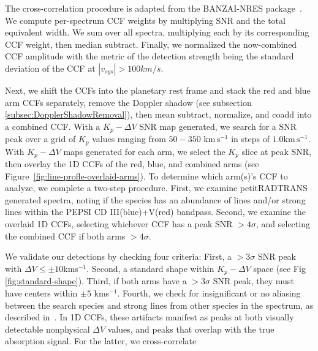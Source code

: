 \documentclass[twocolumn]{aastex631}
\begin{document}
            The cross-correlation procedure is adapted from the BANZAI-NRES package~\citep{McCully2022}. We compute per-spectrum CCF weights by multiplying SNR and the total equivalent width. We sum over all spectra, multiplying each by its corresponding CCF weight, then median subtract. Finally, we normalized the now-combined CCF amplitude with the metric of the detection strength being the standard deviation of the CCF at $|v_{sys}| > 100 km/s$.
            
            Next, we shift the CCFs into the planetary rest frame and stack the red and blue arm CCFs separately, remove the Doppler shadow (see subsection \ref{subsec:DopplerShadowRemoval}), then mean subtract, normalize, and coadd into a combined CCF. With a ${K_p-\Delta\!V}$ SNR map generated, we search for a SNR peak over a grid of $K_p$ values ranging from $50-350$ $\text{km}\,\text{s}^{-1}$ in steps of $1.0 \text{km}\,\text{s}^{-1}$. With $K_p-\Delta V$ maps generated for each arm, we select the $K_p$ slice at peak SNR, then overlay the 1D CCFs of the red, blue, and combined arms (see Figure~\ref{fig:line-profle-overlaid-arms}). To determine which arm(s)'s CCF to analyze, we complete a two-step procedure. First, we examine petitRADTRANS generated spectra, noting if the species has an abundance of lines and/or strong lines within the PEPSI CD III(blue)+V(red) bandpass. Second, we examine the overlaid 1D CCFs, selecting whichever CCF has a peak SNR $>4\sigma$, and selecting the combined CCF if both arms $>4\sigma$.
            
            We validate our detections by checking four 
            criteria: First, a $>{3\sigma}$ SNR peak with  $\Delta V \leq \pm10$kms$^{-1}$. Second, a standard shape within ${K_p-\Delta V}$ space (see Fig \ref{fig:standard-shape}). Third, if both arms have a $>{3\sigma}$ SNR peak, they must have centers within $\pm 5$ kms$^{-1}$. Fourth, we check for insignificant or no aliasing between the search species and strong lines from other species in the spectrum, as described in~\citet{Borsato2023, Petz2023}. In 1D CCFs, these artifacts manifest as peaks at both visually detectable nonphysical $\Delta V$ values, and peaks that overlap with the true absorption signal. For the latter, we cross-correlate 
\end{document}
